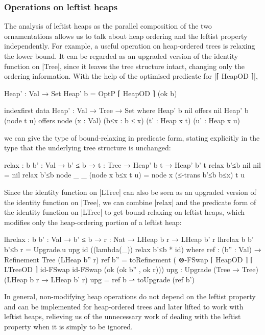 \subsubsection{Operations on leftist heaps}

The analysis of leftist heaps as the parallel composition of the two ornamentations allows us to talk about heap ordering and the leftist property independently.
For example, a useful operation on heap-ordered trees is relaxing the lower bound.
It can be regarded as an upgraded version of the identity function on |Tree|, since it leaves the tree structure intact, changing only the ordering information.
With the help of the optimised predicate for |⌈ HeapOD ⌉|,
\begin{code}
Heap' : Val → Set
Heap' b = OptP ⌈ HeapOD ⌉ (ok b)

indexfirst data Heap' : Val → Tree → Set where
  Heap' b  nil         offers  nil
  Heap' b  (node t u)  offers  node  (x : Val) (b≤x : b ≤ x)
                                     (t' : Heap x t) (u' : Heap x u)
\end{code}
we can give the type of bound-relaxing in predicate form, stating explicitly in the type that the underlying tree structure is unchanged:
\begin{code}
relax : {b b' : Val} → b' ≤ b → {t : Tree} → Heap' b t → Heap' b' t
relax b'≤b {nil       }  nil               =  nil
relax b'≤b {node _ _  }  (node x b≤x t u)  =  node x (≤-trans b'≤b b≤x) t u
\end{code}
Since the identity function on |LTree| can also be seen as an upgraded version of the identity function on |Tree|, we can combine |relax| and the predicate form of the identity function on |LTree| to get bound-relaxing on leftist heaps, which modifies only the heap-ordering portion of a leftist heap:
\begin{code}
lhrelax : {b b' : Val} → b' ≤ b → {r : Nat} → LHeap b r → LHeap b' r
lhrelax {b} {b'} b'≤b {r} = Upgrade.u upg id ((lambda(_)) relax b'≤b * id)
  where
    ref : (b'' : Val) → Refinement Tree (LHeap b'' r)
    ref b'' =  toRefinement
                 (  ⊗-FSwap ⌈ HeapOD ⌉ ⌈ LTreeOD ⌉ id-FSwap id-FSwap
                      (ok (ok b'' , ok r)))
    upg : Upgrade (Tree → Tree) (LHeap b r → LHeap b' r)
    upg = ref b ⇀ toUpgrade (ref b')
\end{code}
In general, non-modifying heap operations do not depend on the leftist property and can be implemented for heap-ordered trees and later lifted to work with leftist heaps, relieving us of the unnecessary work of dealing with the leftist property when it is simply to be ignored.
